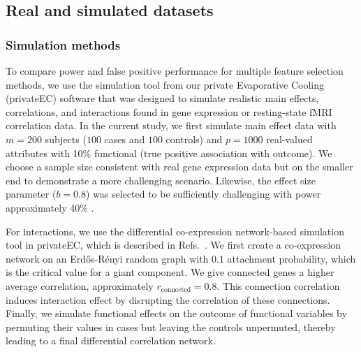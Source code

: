 \documentclass[10pt]{article}
\begin{document}
\subsection{Real and simulated datasets}
\subsubsection{Simulation methods}
To compare power and false positive performance for multiple feature selection methods, we use the simulation tool from our private Evaporative Cooling (privateEC) software \cite{le17} that was designed to simulate realistic main effects, correlations, and interactions found in gene expression or resting-state fMRI correlation data.
In the current study, we first simulate main effect data with $m=200$ subjects ($100$ cases and $100$ controls) and $p=1000$ real-valued attributes with 10\% functional (true positive association with outcome).
We choose a sample size consistent with real gene expression data but on the smaller end to demonstrate a more challenging scenario.
Likewise, the effect size parameter ($b=0.8$) was selected to be sufficiently challenging with power approximately 40\% \cite{le17}. 

For interactions, we use the differential co-expression network-based simulation tool in privateEC, which is described in Refs.~\cite{le17, lareau15}. 
We first create a co-expression network on an Erd\H{o}s-R\'enyi random graph with $0.1$ attachment probability, which is the critical value for a giant component.
We give connected genes a higher average correlation, approximately $r_{\text{connected}}=0.8$. %
This connection correlation induces interaction effect by disrupting the correlation of these connections. %
Finally, we simulate functional effects on the outcome of functional variables by permuting their values in cases but leaving the controls unpermuted, thereby leading to a final differential correlation network. 
\end{document}
